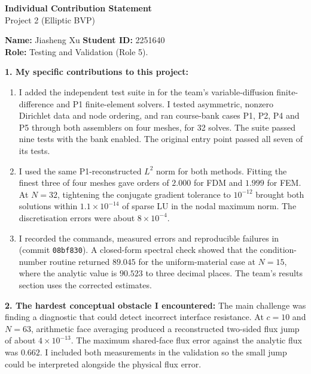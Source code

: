 \documentclass[10pt]{article}
\begin{document}
\begin{center}
    {\Large\bfseries Individual Contribution Statement}\\[0.2em]
    {\large Project 2 (Elliptic BVP)}
\end{center}

\begin{formbox}
\textbf{Name:} Jiasheng Xu \hfill \textbf{Student ID:} 2251640\\
\textbf{Role:} Testing and Validation (Role 5).

\textbf{1. My specific contributions to this project:}
\begin{enumerate}[leftmargin=2em,itemsep=0.25em,topsep=0.15em]
    \item I added the independent test suite in
     for the team's variable-diffusion
    finite-difference and P1 finite-element solvers. I tested asymmetric,
    nonzero Dirichlet data and node ordering, and ran course-bank cases
    P1, P2, P4 and P5 through both assemblers on four meshes, for 32 solves.
    The suite passed nine tests with the bank enabled. The original
     entry point passed all seven of its tests.

    \item I used the same P1-reconstructed \(L^2\) norm for both methods.
    Fitting the finest three of four meshes gave orders of \(2.000\) for
    FDM and \(1.999\) for FEM. At \(N=32\), tightening the conjugate gradient
    tolerance to \(10^{-12}\) brought both solutions within
    \(1.1\times10^{-14}\) of sparse LU in the nodal maximum norm. The
    discretisation errors were about \(8\times10^{-4}\).

    \item I recorded the commands, measured errors and reproducible failures
    in 
    (commit \texttt{08bf830}). A closed-form spectral check showed that the
    condition-number routine returned \(89.045\) for the uniform-material
    case at \(N=15\), where the analytic value is \(90.523\) to three
    decimal places. The team's results section uses the corrected estimates.
\end{enumerate}

\textbf{2. The hardest conceptual obstacle I encountered:} The main challenge
was finding a diagnostic that could detect incorrect interface resistance.
At \(c=10\) and \(N=63\), arithmetic face averaging produced a reconstructed
two-sided flux jump of about \(4\times10^{-13}\). The maximum shared-face flux error against the
analytic flux was \(0.662\). I included both measurements in the validation
so the small jump could be interpreted alongside the physical flux error.


\end{formbox}
\end{document}
